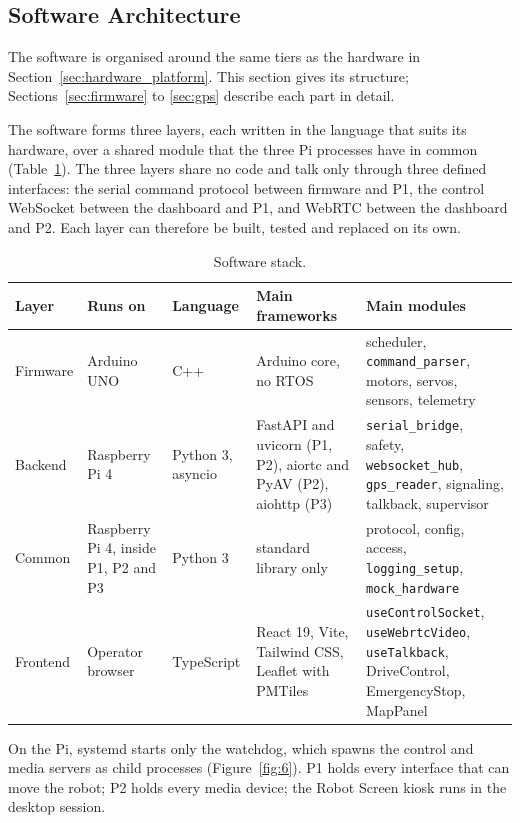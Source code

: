 \subsection{Software Architecture}
\label{sec:software_architecture}

The software is organised around the same tiers as the hardware in Section~\ref{sec:hardware_platform}. This section gives its structure; Sections~\ref{sec:firmware} to \ref{sec:gps} describe each part in detail.

The software forms three layers, each written in the language that suits its hardware, over a shared module that the three Pi processes have in common (Table~\ref{tab:5}). The three layers share no code and talk only through three defined interfaces: the serial command protocol between firmware and P1, the control WebSocket between the dashboard and P1, and WebRTC between the dashboard and P2. Each layer can therefore be built, tested and replaced on its own.

\begin{table}[!t]
\centering
\caption{Software stack.}
\label{tab:5}
\begin{tabularx}{\linewidth}{p{1.8cm} p{2.1cm} p{2.3cm} X X}
\toprule
Layer & Runs on & Language & Main frameworks & Main modules \\
\midrule
Firmware & Arduino UNO & C++ & Arduino core, no RTOS & scheduler, \texttt{command\_parser}, motors, servos, sensors, telemetry \\
Backend & Raspberry Pi 4 & Python 3, asyncio & FastAPI and uvicorn (P1, P2), aiortc and PyAV (P2), aiohttp (P3) & \texttt{serial\_bridge}, safety, \texttt{websocket\_hub}, \texttt{gps\_reader}, signaling, talkback, supervisor \\
Common & Raspberry Pi 4, inside P1, P2 and P3 & Python 3 & standard library only & protocol, config, access, \texttt{logging\_setup}, \texttt{mock\_hardware} \\
Frontend & Operator browser & TypeScript & React 19, Vite, Tailwind CSS, Leaflet with PMTiles & \texttt{useControlSocket}, \texttt{useWebrtcVideo}, \texttt{useTalkback}, DriveControl, EmergencyStop, MapPanel \\
\bottomrule
\end{tabularx}
\end{table}

On the Pi, systemd starts only the watchdog, which spawns the control and media servers as child processes (Figure~\ref{fig:6}). P1 holds every interface that can move the robot; P2 holds every media device; the Robot Screen kiosk runs in the desktop session.


